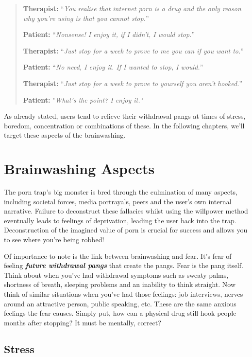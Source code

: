 \documentclass[
]{book}
\begin{document}
\begin{quote}
\textbf{Therapist:} ``\emph{You realise that internet porn is a drug and the only reason why you're using is that you cannot stop.}''

\textbf{Patient:} ``\emph{Nonsense! I enjoy it, if I didn't, I would stop.}''

\textbf{Therapist:} ``\emph{Just stop for a week to prove to me you can if you want to.}''

\textbf{Patient:} ``\emph{No need, I enjoy it. If I wanted to stop, I would.}''

\textbf{Therapist:} ``\emph{Just stop for a week to prove to yourself you aren't hooked.}''

\textbf{Patient:} "\emph{What's the point? I enjoy it."}
\end{quote}

As already stated, users tend to relieve their withdrawal pangs at times of stress, boredom, concentration or combinations of these. In the following chapters, we'll target these aspects of the brainwashing.

\hypertarget{brainwashing-aspects}{%
\chapter{Brainwashing Aspects}\label{brainwashing-aspects}}

The porn trap's big monster is bred through the culmination of many aspects, including societal forces, media portrayals, peers and the user's own internal narrative. Failure to deconstruct these fallacies whilst using the willpower method eventually leads to feelings of deprivation, leading the user back into the trap. Deconstruction of the imagined value of porn is crucial for success and allows you to see where you're being robbed!

Of importance to note is the link between brainwashing and fear. It's fear of feeling \textbf{\emph{future withdrawal pangs}} that create the pangs. Fear is the pang itself. Think about when you've had withdrawal symptoms such as sweaty palms, shortness of breath, sleeping problems and an inability to think straight. Now think of similar situations when you've had those feelings: job interviews, nerves around an attractive person, public speaking, etc. These are the same anxious feelings the fear causes. Simply put, how can a physical drug still hook people months after stopping? It must be mentally, correct?

\hypertarget{stress}{%
\section{Stress}\label{stress}}
\end{document}
